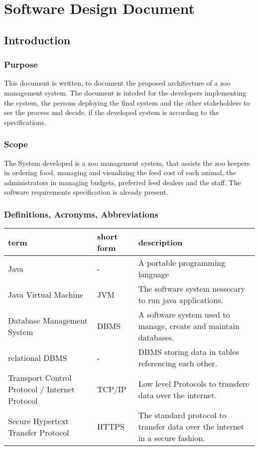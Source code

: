 \section{Software Design Document}

	\subsection{Introduction}
		\subsubsection{Purpose}
			This document is written, to document the proposed architecture of a zoo management system. The document is inteded for the developers implementing the system, the persons deploying the final system and the other stakeholders to see the process and decide, if the developed system is according to the specifications.
		\subsubsection{Scope}
			The System developed is a zoo management system, that assists the zoo keepers in ordering food, managing and visualizing the feed cost of each animal, the administrators in managing budgets, preferred feed dealers and the staff. The software requirements specification is already present.
		\subsubsection{Definitions, Acronyms, Abbreviations}
			\begin{tabular}{|p{}|p{}|p{}|}
				\hline
			\textbf{term}&\textbf{short form}&\textbf{description}\\
				\hline
				Java&-&A portable programming language\\
				\hline
				Java Virtual Machine&JVM&The software system nessecary to run java applications.\\
				\hline
				Database Management System&DBMS&A software system used to manage, create and maintain databases.\\
				\hline
				relational DBMS&-&DBMS storing data in tables referencing each other.\\
				\hline
				Transport Control Protocol / Internet Protocol&TCP/IP&Low level Protocols to transfere data over the internet.\\
				\hline
				Secure Hypertext Transfer Protocol&HTTPS&The standard protocol to transfer data over the internet in a secure fashion.\\
				\hline

			\end{tabular}
